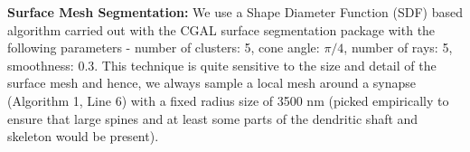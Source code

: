 \documentclass[runningheads]{llncs}
\begin{document}





\noindent \textbf{Surface Mesh Segmentation:}
\label{sec:segmentation}
We use a Shape Diameter Function (SDF) based algorithm  carried out with the CGAL surface segmentation package %
with the following parameters - number of clusters: 5, cone angle: $\pi/4$, number of rays: 5, smoothness: 0.3. This technique is quite sensitive to the size and detail of the surface mesh  and hence, we always sample a local mesh around a synapse (Algorithm 1, Line 6) with a fixed radius size of 3500 nm (picked empirically to ensure that large spines and at least some parts of the dendritic shaft and skeleton would be present). 

\end{document}

